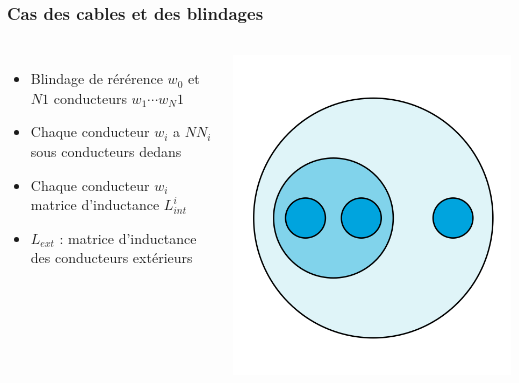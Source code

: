 \begin{frame}
\frametitle{Cas des cables et des blindages}
  \begin{columns}[T]
    \begin{itemize}
      \item Blindage de r\'er\'erence $w_0$ et $N1$ conducteurs $w_1 \cdots w_N1$
      \item Chaque conducteur $w_i$ a $NN_i$ sous conducteurs dedans
      \item Chaque conducteur $w_i$ matrice d'inductance $L_{int}^i$
      \item $L_{ext}$ : matrice d'inductance des conducteurs ext\'erieurs  
    \end{itemize}
\begin{center}
\includegraphics[scale=0.25]{figures/f2}
\end{center}
  \end{columns}
\end{frame}

